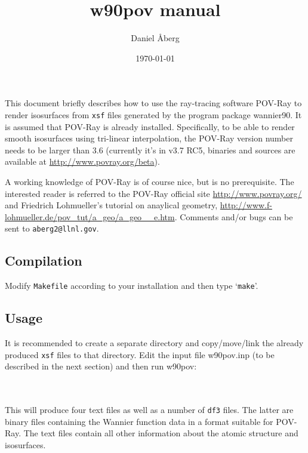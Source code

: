 \documentclass[
  notitlepage,
  twoside,
   prb,
  floatfix,
]{revtex4-1}
\begin{document}
 \title{
 w90pov manual
}
\author{Daniel \AA{}berg}
\date{\today}

\maketitle
This document briefly describes how to use the ray-tracing software \textsf{POV-Ray} to render isosurfaces from {\tt xsf} files generated by the program package \textsf{wannier90}. It is assumed that \textsf{POV-Ray} is already installed. Specifically, to be able to render smooth isosurfaces using tri-linear interpolation, the \textsf{POV-Ray} version number needs to be larger than 3.6 (currently it's in v3.7 RC5, binaries and sources are available at \url{http://www.povray.org/beta}).

A working knowledge of \textsf{POV-Ray} is of course nice, but is no prerequisite. The interested reader is referred to the  \textsf{POV-Ray} official site \url{http://www.povray.org/} and Friedrich Lohmueller's tutorial on anaylical geometry, \url{http://www.f-lohmueller.de/pov_tut/a_geo/a_geo__e.htm}. Comments and/or bugs can be sent to {\tt aberg2@llnl.gov}.

\subsection*{Compilation}
Modify {\tt Makefile} according to your installation and then type `{\tt make}'.

\subsection*{Usage}
It is recommended to create a separate directory and copy/move/link the already produced {\tt xsf} files to that directory. Edit the input file \textsf{w90pov.inp} (to be described in the next section) and then run \textsf{w90pov}:

\mbox{}\\
\mbox{}\\

This will produce four text files as well as a number of {\tt df3} files. The latter are binary files containing the Wannier function data in a format suitable for \textsf{POV-Ray}. The text files contain all other information about the atomic structure and isosurfaces.
\end{document}
